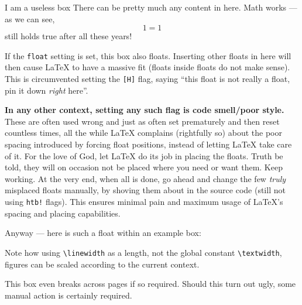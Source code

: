 \begin{example}{I am a useless box}\label{ill:example}
    There can be pretty much any content in here.
    Math works --- as we can see,
    \begin{equation}
        1 = 1
    \end{equation}
    still holds true after all these years!

    If the \verb|float| setting is set, this box also floats.
    Inserting other floats in here will then cause \LaTeX{} to have a massive fit
    (floats inside floats do not make sense).
    This is circumvented setting the \verb|[H]| flag,
    saying \enquote{this float is not really a float, pin it down \emph{right} here}.

    \textbf{In any other context, setting any such flag is code smell/poor style.}
    These are often used wrong and just as often set prematurely and then reset
    countless times, all the while \LaTeX{} complains (rightfully so) about the poor
    spacing introduced by forcing float positions, instead of letting \LaTeX{} take
    care of it.
    For the love of God, let \LaTeX{} do its job in placing the floats.
    Truth be told, they will on occasion not be placed where you need or want them.
    Keep working.
    At the very end, when all is done, go ahead and change the few \emph{truly}
    misplaced floats manually, by shoving them about in the source code
    (still not using \verb|htb!| flags).
    This ensures minimal pain and maximum usage of \LaTeX{}'s spacing and placing
    capabilities.

    Anyway --- here is such a float within an example box:
    \begin{figure}[H]
    \end{figure}
    Note how using \verb|\linewidth| as a length, not the global constant
    \verb|\textwidth|, figures can be scaled according to the current context.

    This box even breaks across pages if so required.
    Should this turn out ugly, some manual action is certainly required.
\end{example}
